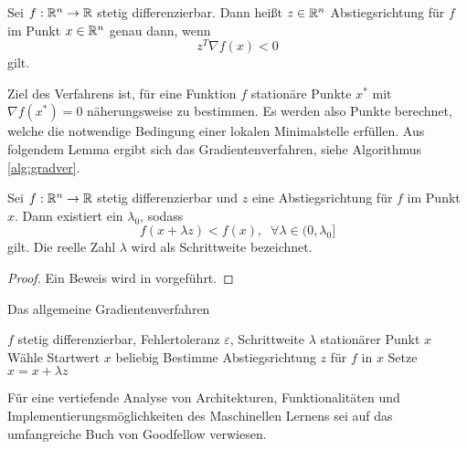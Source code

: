 \begin{defi}[Abstiegsrichtung]
    Sei $f:\mathbb{R}^n \rightarrow \mathbb{R}$ stetig differenzierbar. Dann heißt $z \in \mathbb{R}^n$ Abstiegsrichtung für $f$ im Punkt $x \in \mathbb{R}^n$ genau dann, wenn
    \begin{equation*}
        z^T \nabla f(x) <0
    \end{equation*}
    gilt. 
\end{defi}
Ziel des Verfahrens ist, für eine Funktion $f$ stationäre Punkte $x^*$ mit $\nabla f(x^*)=0$ näherungsweise zu bestimmen. Es werden also Punkte berechnet, welche die notwendige Bedingung einer lokalen Minimalstelle erfüllen.
Aus folgendem Lemma ergibt sich das Gradientenverfahren, siehe Algorithmus \ref{alg:gradver}. 
\begin{lem}
    \label{abst_dir}
    Sei $f:\mathbb{R}^n \rightarrow \mathbb{R}$ stetig differenzierbar und $z$ eine Abstiegsrichtung für $f$ im Punkt $x$. Dann existiert ein $\lambda_0$, sodass 
    \begin{equation*}
        f(x+\lambda z) < f(x), \; \; \forall \lambda \in (0, \lambda_0]
    \end{equation*}
    gilt. Die reelle Zahl $\lambda$ wird als Schrittweite bezeichnet.
\end{lem}

\begin{proof}
    Ein Beweis wird in \cite{nocedal1999numerical} vorgeführt.
\end{proof}

\begin{algorithm}[h]
    \caption{Das allgemeine Gradientenverfahren}\label{alg:gradver}
    \begin{algorithmic}
    \Require $f$ stetig differenzierbar, Fehlertoleranz $\varepsilon$, Schrittweite $\lambda$ 
    \Ensure stationärer Punkt $x$
    \State Wähle Startwert $x$ beliebig
        \State Bestimme Abstiegsrichtung $z$ für $f$ in $x$
        \State Setze $x=x+ \lambda z$
    \EndWhile
    \end{algorithmic}
\end{algorithm}

Für eine vertiefende Analyse von Architekturen, Funktionalitäten und Implementierungsmöglichkeiten des Maschinellen Lernens sei auf das umfangreiche Buch von Goodfellow \cite{Goodfellow-et-al-2016} verwiesen.

